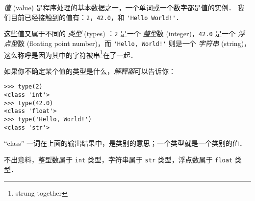 
{\em 值} (value) 是程序处理的基本数据之一，一个单词或一个数字都是值的实例．  我们目前已经接触到的值有：\lstinline{2}，\lstinline{42.0}，和 \lstinline{'Hello World!'}．


这些值又属于不同的 {\em 类型} (types) ：\lstinline{2} 是一个 {\em 整型}数 (integer)，\lstinline{42.0} 是一个 {\em 浮点型}数 (floating point number)，而 \lstinline{'Hello, World!'}  则是一个  {\em 字符串} (string)，这么称呼是因为其中的字符被串\footnote{strung together}在了一起．
  
  


如果你不确定某个值的类型是什么，{\em 解释器}可以告诉你：

\begin{lstlisting}
>>> type(2)
<class 'int'>
>>> type(42.0)
<class 'float'>
>>> type('Hello, World!')
<class 'str'>
\end{lstlisting}

%

``class'' 一词在上面的输出结果中，是类别的意思；一个类型就是一个类别的值．
  


不出意料，整型数属于 \lstinline{int} 类型，字符串属于 \lstinline{str} 类型，浮点数属于 \lstinline{float} 类型．
    
    
    
    


